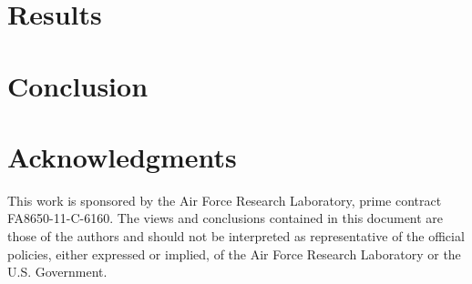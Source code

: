 \documentclass[11pt,a4paper]{article}
\begin{document}
\section{Results}
\label{sec:Results}



\section{Conclusion}



 \section*{Acknowledgments}
This work is sponsored by the Air Force Research Laboratory, prime contract FA8650-11-C-6160.  The views and conclusions contained in this document are those of the authors and should not be interpreted as representative of the official policies, either expressed or implied, of the Air Force Research Laboratory or the U.S. Government.



\end{document}
